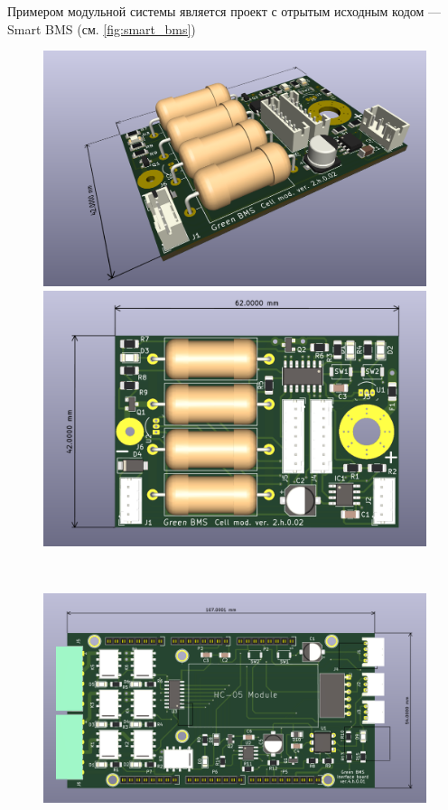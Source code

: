 Примером модульной системы является проект с отрытым исходным кодом --- Smart BMS (см. \figurename\ref{fig:smart_bms})
\begin{figure}[h]
	\centering
	\begin{minipage}{0.45\linewidth}
		\includegraphics[width=\linewidth]{img/smart_bms_cell_1.png}
	\end{minipage}
	\begin{minipage}{0.45\linewidth}
	    \includegraphics[width=\linewidth]{img/smart_bms_cell_2.png}
        \end{minipage} \\	
	\begin{minipage}{0.45\linewidth}
	    \includegraphics[width=\linewidth]{img/smart_bms_ctrl.png}

\end{minipage}
\end{figure}
